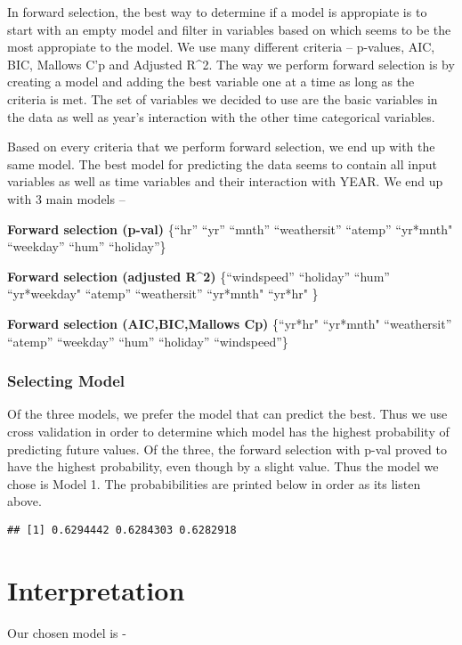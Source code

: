 \documentclass[]{article}
\begin{document}
In forward selection, the best way to determine if a model is appropiate
is to start with an empty model and filter in variables based on which
seems to be the most appropiate to the model. We use many different
criteria -- p-values, AIC, BIC, Mallows C'p and Adjusted R\^{}2. The way
we perform forward selection is by creating a model and adding the best
variable one at a time as long as the criteria is met. The set of
variables we decided to use are the basic variables in the data as well
as year's interaction with the other time categorical variables.

Based on every criteria that we perform forward selection, we end up
with the same model. The best model for predicting the data seems to
contain all input variables as well as time variables and their
interaction with YEAR. We end up with 3 main models --

\textbf{Forward selection (p-val)} \{``hr'' ``yr'' ``mnth''
``weathersit'' ``atemp'' ``yr*mnth" ``weekday'' ``hum'' ``holiday''\}

\textbf{Forward selection (adjusted R\^{}2) } \{``windspeed''
``holiday'' ``hum'' ``yr*weekday" ``atemp'' ``weathersit'' ``yr*mnth"
``yr*hr" \}

\textbf{Forward selection (AIC,BIC,Mallows Cp)} \{``yr*hr" ``yr*mnth"
``weathersit'' ``atemp'' ``weekday'' ``hum'' ``holiday'' ``windspeed''\}

\subsubsection{Selecting Model}\label{selecting-model}

Of the three models, we prefer the model that can predict the best. Thus
we use cross validation in order to determine which model has the
highest probability of predicting future values. Of the three, the
forward selection with p-val proved to have the highest probability,
even though by a slight value. Thus the model we chose is Model 1. The
probabibilities are printed below in order as its listen above.

\begin{verbatim}
## [1] 0.6294442 0.6284303 0.6282918
\end{verbatim}

\section{Interpretation}\label{interpretation}

Our chosen model is -
\end{document}
